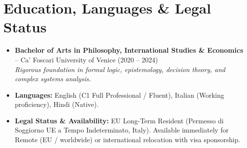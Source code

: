 \documentclass[a4paper,10pt]{article}
\begin{document}
\section{Education, Languages \& Legal Status}
\begin{itemize}
  \item \textbf{Bachelor of Arts in Philosophy, International Studies \& Economics} -- Ca' Foscari University of Venice (2020 -- 2024) \\
  \textit{Rigorous foundation in formal logic, epistemology, decision theory, and complex systems analysis.}
  \item \textbf{Languages:} English (C1 Full Professional / Fluent), Italian (Working proficiency), Hindi (Native).
  \item \textbf{Legal Status \& Availability:} EU Long-Term Resident (Permesso di Soggiorno UE a Tempo Indeterminato, Italy). Available immediately for Remote (EU / worldwide) or international relocation with visa sponsorship.
\end{itemize}
\end{document}
